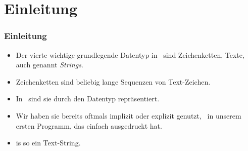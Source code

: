 \documentclass[aspectratio=169,mathserif,notheorems]{beamer}%
\subtitle{11.~Der Datentyp str}%
\begin{document}
%
%
\startPresentation%
%
\section{Einleitung}%
\begin{frame}%
\frametitle{Einleitung}%
\begin{itemize}%
\item Der vierte wichtige grundlegende Datentyp in \python\ sind Zeichenketten, Texte, auch genannt \emph{Strings}.\cite{PSF:P3D:TPSL:TSTS}%
\item<2-> Zeichenketten sind beliebig lange Sequenzen von Text-Zeichen.%
\item<3-> In \python\ sind sie durch den Datentyp  repräsentiert.%
\item<4-> Wir haben sie bereits oftmals implizit oder explizit genutzt, \DEzB\ in unserem ersten Programm, das einfach  ausgedruckt hat.%
\item<5->  is so ein Text-String.%
\end{itemize}%
\end{frame}%
%
%
\end{document}
